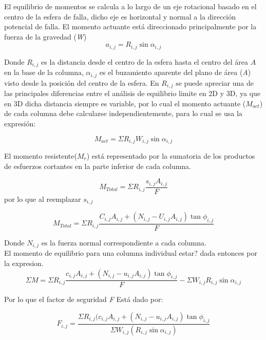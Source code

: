 El equilibrio de momentos se calcula a lo largo de un eje rotacional basado en el centro de la esfera de falla, dicho eje es horizontal y normal a la direcci\'on potencial de falla.
El momento actuante est\'a direccionado principalmente por la fuerza de la gravedad (\textit{W})
$$a_{i,j}=R_{i,j}\sin \alpha_{i,j}$$ 

Donde $\textit{R}_{i,j}$ es la distancia desde el centro de la esfera hasta el centro del \'area $\textit{A}$ en la base de la columna, $\alpha_{i,j}$ es el buzamiento aparente del plano de \'area (\textit{A}) visto desde la posici\'on del centro de la esfera. En $\textit{R}_{i,j}$ se puede apreciar una de las principales diferencias entre el an\'alisis de equilibrio limite en 2D y 3D, ya que en 3D dicha distancia siempre es variable, por lo cual el momento actuante ($\textit{M}_{act}$) de cada columna debe calcularse independientemente, para lo cual se usa la expresi\'on:

$$\textit{M}_{act}=\Sigma \textit{R}_{i,j}\textit{W}_{i,j}\sin\alpha_{i,j}  $$

El momento resistente($\textit{M}_{r}$)  est\'a representado por la sumatoria de los productos de esfuerzos cortantes en la parte inferior de cada columna.

$$\textit{M}_{Total}= \Sigma \textit{R}_{i,j}\frac{\textit{s}_{i,j}\textit{A}_{i,j}}{\textit{F}}  $$
por lo que al reemplazar $\textit{s}_{i,j}$ 

$$ {M}_{Total} = \Sigma \textit{R}_{i,j} \frac{\textit{C}_{i,j}\textit{A}_{i,j}+(\textit{N}_{i,j}-\textit{U}_{i,j}\textit{A}_{i,j})\tan\phi_{i,j}}{\textit{F}} $$

Donde $\textit{N}_{i,j}$ es la fuerza normal correspondiente a cada columna.\\

El momento de equilibrio para una columna individual estar? dada entonces por la expresion.
$$ \Sigma \textit{M}= \Sigma \textit{R}_{i,j} \frac{\textit{c}_{i,j}\textit{A}_{i,j}+(\textit{N}_{i,j}-\textit{u}_{i,j}\textit{A}_{i,j})\tan\phi _{i,j}}{F}-\Sigma \textit{W}_{i,j}\textit{R}_{i,j}\sin \alpha _{i,j} $$

Por lo que el factor de seguridad \textit{F} Est\'a dado por:

$$\textit{F}_{i,j}=  \frac{\Sigma \textit{R}_{i,j}(\textit{c}_{i,j}\textit{A}_{i,j}+(\textit{N}_{i,j}-\textit{u}_{i,j}\textit{A}_{i,j})\tan \phi _{i,j}}{\Sigma \textit{W} _{i,j}(\textit{R} _{i,j}\sin\alpha _{i,j})}  $$

